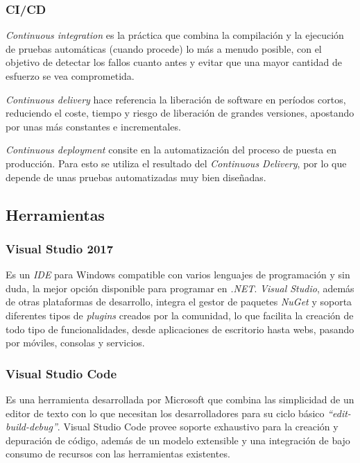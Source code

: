         \subsubsection{CI/CD}
            \textit{Continuous integration} es la práctica que combina la compilación y la ejecución de pruebas automáticas (cuando procede) lo más a menudo posible, con el objetivo de detectar los fallos cuanto antes y evitar que una mayor cantidad de esfuerzo se vea comprometida.
            
            \textit{Continuous delivery} hace referencia la liberación de software en períodos cortos, reduciendo el coste, tiempo y riesgo de liberación de grandes versiones, apostando por unas más constantes e incrementales.
            
            \textit{Continuous deployment} consite en la automatización del proceso de puesta en producción. Para esto se utiliza el resultado del \textit{Continuous Delivery}, por lo que depende de unas pruebas automatizadas muy bien diseñadas. \cite{ci} \cite{cd} \cite{cicd}

    \subsection{Herramientas} 
        \subsubsection{Visual Studio 2017}
            Es un \textit{IDE} para Windows compatible con varios lenguajes de programación y sin duda, la mejor opción disponible para programar en \textit{.NET}. \textit{Visual Studio}, además de otras plataformas de desarrollo, integra el gestor de paquetes \textit{NuGet} y soporta diferentes tipos de \textit{plugins} creados por la comunidad, lo que facilita la creación de todo tipo de funcionalidades, desde aplicaciones de escritorio hasta webs, pasando por móviles, consolas y servicios. \cite{visualstudio} \cite{wikivisualstudio}

        \subsubsection{Visual Studio Code}
            Es una herramienta desarrollada por Microsoft que combina las simplicidad de un editor de texto con lo que necesitan los desarrolladores para su ciclo básico \textit{``edit-build-debug''}. Visual Studio Code provee soporte exhaustivo para la creación y depuración de código, además de un modelo extensible y una integración de bajo consumo de recursos con las herramientas existentes.

